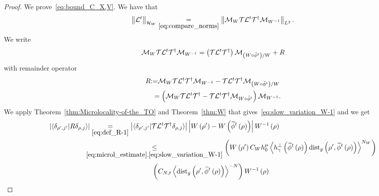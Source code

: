 \documentclass[10pt]{amsart}
\theoremstyle{definition}\newtheorem{defi}[theo]{Definition}\newtheorem{rema}[theo]{Remark}\newtheorem{exam}[theo]{Example}\newtheorem{exem}[theo]{Example}\newtheorem{nota}[theo]{Notation}
\newcommand{\clT}{\mathcal{T}}
\newcommand{\clH}{\mathcal{H}}
\newcommand{\clL}{\mathcal{L}}
\newcommand{\clM}{\mathcal{M}}
\newcommand{\dist}{\mathrm{dist}}
\let\oldtilde\tilde
\renewcommand*{\tilde}[1]{\mathchoice{\widetilde{#1}}{\widetilde{#1}}{\oldtilde{#1}}{\oldtilde{#1}}}
\begin{document}
\begin{proof}
We prove~\eqref{eq:bound_C_X,V}. We have that
\[
\left\Vert \clL^{t}\right\Vert _{\clH _{W}}\underset{\eqref{eq:compare_norms}}{=}\left\Vert \clM_{W}\text{\ensuremath{\clT}\ensuremath{\clL^{t}}\ensuremath{\clT^{\dagger}}}\clM_{W^{-1}}\right\Vert _{L^{2}}.
\]
We write
\begin{equation}\label{eq:decomp}
\clM_{W}\text{\ensuremath{\clT}\ensuremath{\clL^{t}}\ensuremath{\clT^{\dagger}}}\clM_{W^{-1}}=\left(\ensuremath{\clT}\ensuremath{\clL^{t}}\ensuremath{\clT^{\dagger}}\right)\clM_{\left(W\circ\tilde{\phi}^{t}\right)/W}+R
\end{equation}
with remainder operator
\begin{equation}\label{eq:def_R-1}
\begin{split}
R & {:=}\clM_{W}\text{\ensuremath{\clT}\ensuremath{\clL^{t}}\ensuremath{\clT^{\dagger}}}\clM_{W^{-1}}-\text{\ensuremath{\clT}\ensuremath{\clL^{t}}\ensuremath{\clT^{\dagger}}}\clM_{\left(W\circ\tilde{\phi}^{t}\right)/W}
\\
& \;=\left(\clM_{W}\text{\ensuremath{\clT}\ensuremath{\clL^{t}}\ensuremath{\clT^{\dagger}}}-\text{\ensuremath{\clT}\ensuremath{\clL^{t}}\ensuremath{\clT^{\dagger}}}\clM_{W\circ\tilde{\phi}^{t}}\right)\clM_{W^{-1}}.
\end{split}
\end{equation}
We apply Theorem~\ref{thm:Microlocality-of-the_TO} and Theorem~\ref{thm:W} that gives~\eqref{eq:slow_variation_W-1} and we get
\begin{equation}
\begin{split} 
\left|\langle\delta_{\rho',j'}|R\delta_{\rho,j}\rangle\right|&\underset{\eqref{eq:def_R-1}}{=} \left|\langle\delta_{\rho',j'}|\text{\ensuremath{\clT}\ensuremath{\clL^{t}}\ensuremath{\clT^{\dagger}}}\delta_{\rho,j}\rangle\right|\left|W\left(\rho'\right)-W\left(\tilde{\phi}^{t}\left(\rho\right)\right)\right|W^{-1}\left(\rho\right)\\
&\mkern-15mu\underset{\eqref{eq:microl_estimate},\eqref{eq:slow_variation_W-1}}{\leq} \left(W\left(\rho'\right)C_{W}h_{0}^{\mu}\left\langle h_{\gamma}^{\perp}\left(\tilde{\phi}^{t}\left(\rho\right)\right)\dist_{g}\left(\rho',\tilde{\phi}^{t}\left(\rho\right)\right)\right\rangle ^{N_{W}}\right)\\
\end{split}
\end{equation}
\begin{align}
&\mkern-15mu\left(C_{N,t}\left\langle \dist_{g}\left(\rho',\tilde{\phi}^{t}\left(\rho\right)\right)\right\rangle ^{-N}\right)W^{-1}\left(\rho\right)\\

\end{align}
\end{proof}
\end{document}

